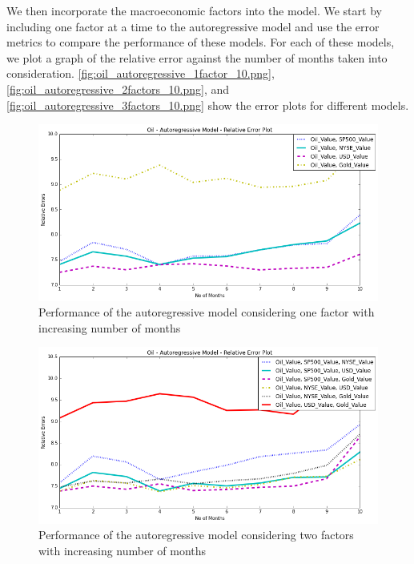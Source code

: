 \documentclass[runningheads]{llncs}
\begin{document}
We then incorporate the macroeconomic factors into the model. We start by including one factor at a time to the autoregressive model and use the error metrics to compare the performance of these models. For each of these models, we plot a graph of the relative error against the number of months taken into consideration. \autoref{fig:oil_autoregressive_1factor_10.png}, \autoref{fig:oil_autoregressive_2factors_10.png}, and \autoref{fig:oil_autoregressive_3factors_10.png} show the error plots for different models. 

\begin{figure}
\centering
\includegraphics[width=\textwidth]{oil_autoregressive_1factor_10.png}
\caption{Performance of the autoregressive model considering one factor with increasing number of months}
\label{fig:oil_autoregressive_1factor_10.png}
\end{figure}

\begin{figure}
\centering
\includegraphics[width=\textwidth]{oil_autoregressive_2factors_10.png}
\caption{Performance of the autoregressive model considering two factors with increasing number of months}
\label{fig:oil_autoregressive_2factors_10.png}
\end{figure}
\end{document}
